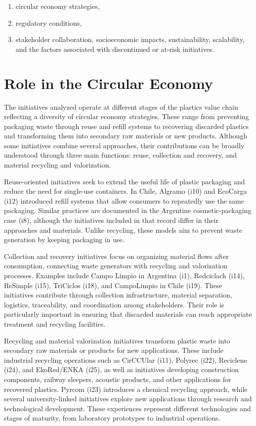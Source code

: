 \documentclass[
  12pt,
  oneside]{book}
\providecommand{\tightlist}{%
  \setlength{\itemsep}{0pt}\setlength{\parskip}{0pt}}
\begin{document}
\begin{enumerate}
\def\labelenumi{\arabic{enumi})}
\tightlist
\item
  circular economy strategies,
\item
  regulatory conditions,
\item
  stakeholder collaboration, socioeconomic impacts, sustainability,
  scalability, and the factors associated with discontinued or at-risk
  initiatives.
\end{enumerate}

\section{Role in the Circular
Economy}\label{role-in-the-circular-economy}

The initiatives analyzed operate at different stages of the plastics
value chain reflecting a diversity of circular economy strategies. These
range from preventing packaging waste through reuse and refill systems
to recovering discarded plastics and transforming them into secondary
raw materials or new products. Although some initiatives combine several
approaches, their contributions can be broadly understood through three
main functions: reuse, collection and recovery, and material recycling
and valorization.

Reuse-oriented initiatives seek to extend the useful life of plastic
packaging and reduce the need for single-use containers. In Chile,
Algramo (i10) and EcoCarga (i12) introduced refill systems that allow
consumers to repeatedly use the same packaging. Similar practices are
documented in the Argentine cosmetic-packaging case (i8), although the
initiatives included in that record differ in their approaches and
materials. Unlike recycling, these models aim to prevent waste
generation by keeping packaging in use.

Collection and recovery initiatives focus on organizing material flows
after consumption, connecting waste generators with recycling and
valorization processes. Examples include Campo Limpio in Argentina (i1),
Redciclach (i14), ReSimple (i15), TriCiclos (i18), and CampoLimpio in
Chile (i19). These initiatives contribute through collection
infrastructure, material separation, logistics, traceability, and
coordination among stakeholders. Their role is particularly important in
ensuring that discarded materials can reach appropriate treatment and
recycling facilities.

Recycling and material valorization initiatives transform plastic waste
into secondary raw materials or products for new applications. These
include industrial recycling operations such as CirCCUlar (i11), Polyrec
(i22), Reciclene (i24), and EkoRed/ENKA (i25), as well as initiatives
developing construction components, railway sleepers, acoustic products,
and other applications for recovered plastics. Pyrcom (i23) introduces a
chemical recycling approach, while several university-linked initiatives
explore new applications through research and technological development.
These experiences represent different technologies and stages of
maturity, from laboratory prototypes to industrial operations.
\end{document}
